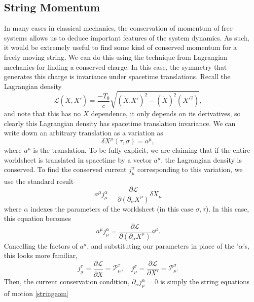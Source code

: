 \documentclass[a4paper,12pt]{article}
\numberwithin{equation}{section}
\begin{document}
\subsection{String Momentum}

In many cases in classical mechanics, the conservation of momentum of free systems allows us to deduce important features of the system dynamics. As such, it would be extremely useful to find some kind of conserved momentum for a freely moving string. We can do this using the technique from Lagrangian mechanics for finding a conserved charge. In this case, the symmetry that generates this charge is invariance under spacetime translations. Recall the Lagrangian density
\begin{equation}
\mathcal{L}(\dot{X}, X') = \frac{-T_0}{c}\sqrt{(\dot{X}.X')^2 - (\dot{X})^2(X'^2)},
\end{equation}
and note that this has no $X$ dependence, it only depends on its derivatives, so clearly this Lagrangian density has spacetime translation invariance. We can write down an arbitrary translation as a variation as
\begin{equation}
\delta X^\mu(\tau, \sigma) = a^\mu,
\end{equation}
where $a^\mu$ is the translation. To be fully explicit, we are claiming that if the entire worldsheet is translated in spacetime by a vector $a^\mu$, the Lagrangian density is conserved. To find the conserved current $j_\mu^\alpha$ corresponding to this variation, we use the standard result \cite{peskin}
\begin{equation}
a^\mu j_\mu^\alpha = \frac{\partial \mathcal{L}}{\partial (\partial_\alpha X^\mu)} \delta X_\mu
\end{equation}
where $\alpha$ indexes the parameters of the worldsheet (in this case $\sigma, \tau$). In this case, this equation becomes
\begin{equation}
a^\mu j_\mu^\alpha = \frac{\partial \mathcal{L}}{\partial (\partial_\alpha X^\mu)} a^\mu.
\end{equation}
Cancelling the factors of $a^\mu$, and substituting our parameters in place of the '$\alpha$'s, this looks more familiar, 
\begin{equation}
j^\tau_\mu = \frac{\partial \mathcal{L}}{\partial \dot{X}} = \mathcal{P}_\mu^\tau, \quad j^\sigma_\mu = \frac{\partial \mathcal{L}}{\partial X'} = \mathcal{P}_\mu^\sigma.
\end{equation}
Then, the current conservation condition, $\partial_\alpha j_\mu^\alpha = 0$ is simply the string equations of motion \ref{stringeom}
\end{document}
